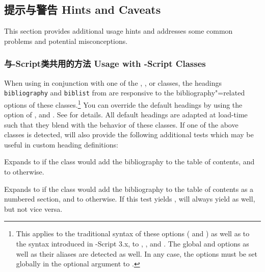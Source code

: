 \subsection{提示与警告 Hints and Caveats}
\label{use:cav}

This section provides additional usage hints and addresses some common problems and potential misconceptions.

\subsubsection{与-Script类共用的方法 Usage with -Script Classes}
\label{use:cav:scr}

When using \biblatex in conjunction with one of the , , or  classes, the headings \texttt{bibliography} and \texttt{biblist} from  are responsive to the bibliography"=related options of these classes.\footnote{This applies to the traditional syntax of these options ( and ) as well as to the \keyval syntax introduced in -Script 3.x, \ie to , , and . The global  and  options as well as their aliases are detected as well. In any case, the options must be set globally in the optional argument to .} You can override the default headings by using the  option of ,  and . See  for details. All default headings are adapted at load-time such that they blend with the behavior of these classes. If one of the above classes is detected, \biblatex will also provide the following additional tests which may be useful in custom heading definitions:

\begin{ltxsyntax}


Expands to  if the class would add the bibliography to the table of contents, and to  otherwise.


Expands to  if the class would add the bibliography to the table of contents as a numbered section, and to  otherwise. If this test yields ,  will always yield  as well, but not vice versa.

\end{ltxsyntax}

